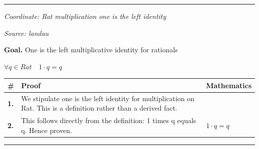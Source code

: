 \documentclass[11pt]{article}
\theoremstyle{definition}
\begin{document}
\label{thm:Rat-addition-zero_is_the_right_identity}
\par\medskip\hrule
\bigskip
{}\par
\smallskip\noindent\textit{Coordinate: Rat \cdot multiplication \cdot one is the left identity}\par
\smallskip\noindent\textit{Source: landau}\par
\medskip
\noindent\textbf{Goal.} One is the left multiplicative identity for rationals\par
\noindent$\displaystyle \forall q \in Rat\quad 1 \cdot q = q$\par
\medskip
\noindent
\begin{tabular}{@{} >{\raggedright\arraybackslash}p{} >{\raggedright\arraybackslash}p{} >{\raggedleft\arraybackslash}p{} @{}}
\textbf{\#} & \textbf{Proof} & \textbf{Mathematics} \\
\midrule
\textbf{1.} & We stipulate one is the left identity for multiplication on Rat. This is a definition rather than a derived fact. & \\[0.45em]
\textbf{2.} & This follows directly from the definition: 1 times q equals q. Hence proven. & $\displaystyle 1 \cdot q = q$ \\[0.45em]
\bottomrule
\end{tabular}
\label{thm:Rat-multiplication-one_is_the_left_identity}
\par\medskip\hrule
\end{document}
